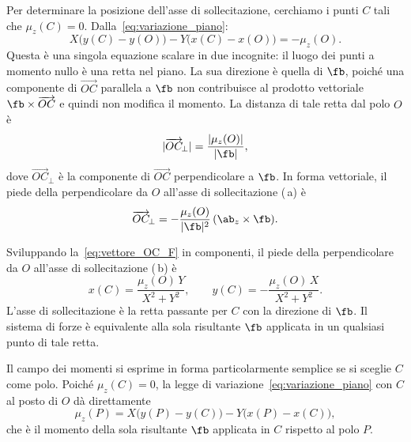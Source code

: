 Per determinare la posizione dell'asse di sollecitazione,
cerchiamo i punti $C$ tali che $\mu_z(C) = 0$.
Dalla~\eqref{eq:variazione_piano}:
\begin{equation}\label{eq:cond_CdR}
	X\bigl(y(C)-y(O)\bigr)
	- Y\bigl(x(C)-x(O)\bigr)
	= -\mu_z(O).
\end{equation}
Questa è una singola equazione scalare in due incognite: il
luogo dei punti a momento nullo è una retta nel piano. La
sua direzione è quella di $\fb$, poiché una componente di
$\overrightarrow{OC}$ parallela a $\fb$ non contribuisce al
prodotto vettoriale $\fb \times \overrightarrow{OC}$ e quindi
non modifica il momento. La distanza di tale retta dal polo
$O$ è
\begin{equation}\label{eq:CdR_distanza}
	|\overrightarrow{OC}_{\!\perp}|
	= \frac{|\mu_z(O)|}{|\fb|},
\end{equation}
dove $\overrightarrow{OC}_{\!\perp}$ è la componente di
$\overrightarrow{OC}$ perpendicolare a $\fb$. In forma
vettoriale, il piede della perpendicolare da $O$ all'asse di
sollecitazione  (\,a) è
\begin{equation}\label{eq:vettore_OC_F}
	\overrightarrow{OC}_{\!\perp}
	= -\frac{\mu_z(O)}{|\fb|^2}\,
	(\ab_z \times \fb).
\end{equation}







Sviluppando la~\eqref{eq:vettore_OC_F} in componenti, il
piede della perpendicolare da $O$ all'asse di sollecitazione  (\,b) è
\begin{equation}\label{eq:CdR_coord}
	x(C) =  \frac{\mu_z(O)\,Y}{X^2+Y^2},
	\qquad
	y(C) =  - \frac{\mu_z(O)\,X}{X^2+Y^2}.
\end{equation}
L'asse di sollecitazione è la retta passante per $C$ con la
direzione di $\fb$. Il sistema di forze è equivalente alla
sola risultante $\fb$ applicata in un qualsiasi punto di
tale retta.

Il campo dei momenti si esprime in forma particolarmente
semplice se si sceglie $C$ come polo. Poiché
$\mu_z(C) = 0$, la legge di
variazione~\eqref{eq:variazione_piano} con $C$ al posto di
$O$ dà direttamente
\begin{equation}\label{eq:momento_da_CdR}
	\mu_z(P) = X\bigl(y(P) - y(C)\bigr)
	- Y\bigl(x(P) - x(C)\bigr),
\end{equation}
che è il momento della sola risultante $\fb$ applicata in $C$
rispetto al polo $P$.

